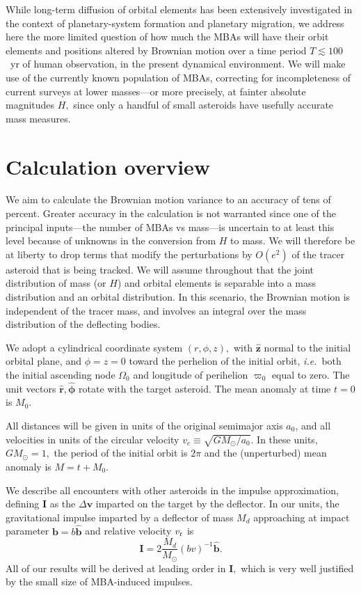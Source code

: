 \documentclass[linenumbers, onecolumn]{aastex631}
\newcommand{\ie}{\textit{i.e.\/}}
\newcommand{\vecI}{\mathbf{I}}
\newcommand{\vecb}{\mathbf{b}}
\newcommand{\bhat}{\mathbf{\hat b}}
\newcommand{\rhat}{\mathbf{\hat r}}
\newcommand{\phat}{\boldsymbol{\hat\phi}}
\newcommand{\zhat}{\mathbf{\hat z}}
\newcommand{\vecv}{\mathbf{v}}
\newcommand{\vcirc}{v_c}
\newcommand{\vrel}{v_{\rm r}}
\newcommand{\Msun}{M_\odot}
\newcommand{\lop}{\varpi}
\begin{document}
While long-term diffusion of orbital elements has been extensively
investigated in the context of planetary-system formation and
planetary migration, we address here the more limited question of how
much the MBAs will have their orbit elements and positions altered
by Brownian motion over a time period $T \lesssim100$~yr of human
observation, in the present dynamical environment.  We will make use
of the currently known population of MBAs, correcting for
incompleteness of current surveys at lower masses---or more precisely,
at fainter absolute magnitudes $H,$ since only a handful of small
asteroids have usefully accurate mass measures.


\section{Calculation overview}
We aim to calculate the Brownian motion variance to an accuracy of
tens of percent.  Greater accuracy in the calculation is not warranted
since one of the principal inputs---the number of MBAs vs mass---is
uncertain to at least this level because of unknowns in the conversion
from $H$ to mass.  We will therefore be at liberty to drop terms that
modify the perturbations by $O(e^2)$ of the tracer asteroid that is
being tracked.    We will assume throughout that the joint
distribution of mass (or $H$) and orbital elements is separable into a
mass distribution and an orbital distribution.  In this scenario, the
Brownian motion is independent of the tracer mass, and involves an
integral over the mass distribution of the deflecting bodies.

We adopt a cylindrical coordinate system $(r,\phi,z),$ with $\zhat$
normal to the initial orbital plane, and $\phi=z=0$ toward the
perhelion of the initial orbit, \ie\ both the initial ascending node
$\Omega_0$ and longitude of perihelion $\lop_0$ equal to zero.  The
unit vectors $\rhat, \phat$ rotate with the target asteroid.  The mean
anomaly at time $t=0$ is $M_0.$

All distances will be given in units of the original semimajor axis $a_0$, and all velocities in units of the circular velocity $\vcirc \equiv \sqrt{G\Msun/a_0}.$  In these units, $G\Msun=1,$ the period of the initial orbit is $2\pi$ and the (unperturbed) mean anomaly is $M=t+M_0.$ 

We describe all encounters with other asteroids in the impulse approximation, defining $\vecI$ as the $\Delta\vecv$ imparted on the target by the deflector.
In our units, the gravitational impulse imparted by a deflector of mass $M_d$ approaching at impact parameter $\vecb=b\bhat$ and relative velocity $\vrel$ is
\begin{equation}
  \vecI = 2 \frac{M_d}{\Msun} (bv)^{-1} \bhat.
  \label{eq:impulse}
\end{equation}
All of our results will be derived at leading order in $\vecI,$ which
is very well justified by the small size of MBA-induced impulses.
\end{document}
